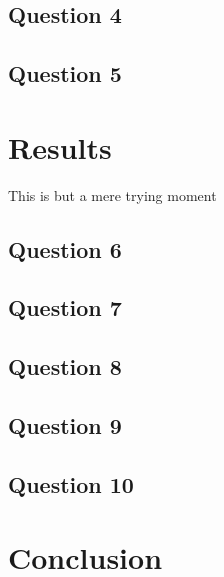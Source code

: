 \documentclass{article}
\begin{document}
\subsection{Question 4}

\subsection{Question 5}

\section{Results}
This is but a mere trying moment


\subsection{Question 6}

\subsection{Question 7}

\subsection{Question 8}

\subsection{Question 9}

\subsection{Question 10}

\section{Conclusion}
\end{document}
